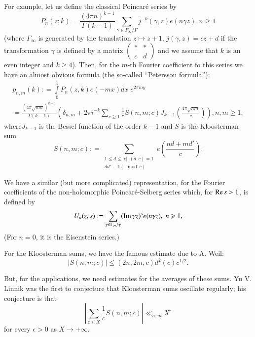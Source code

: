 For example, let us define the classical Poincar\'e series by 
\begin{equation}
P_n (z;k) = \frac{(4\pi n)^{k-1}}{\Gamma (k-1)} \sum\limits_{\gamma \in \Gamma_\infty / \Gamma} j^{-k} (\gamma, z) e (n\gamma z), n \geqslant 1 \label{art7-eq1.5}
\end{equation}
(where $\Gamma_\infty$ is generated by the translation $z \mapsto z + 1$, $j(\gamma, z) = cz + d$ if the transformation $\gamma$ is defined by a matrix $\left(\begin{smallmatrix}
\ast & \ast\\
c & d
\end{smallmatrix} \right)$ and we assume that $k$ is an even integer and $k \geqslant 4$). Then, for the $m$-th Fourier coefficient fo this series we have an almost obvious formula (the so-called ``Petersson formula''):
\begin{align}
p_{n,m} (k) : = \int\limits^1_0 P_n (z,k) e (-mx) dx \; e^{2\pi my}\label{art7-eq1.6}\\
 = \frac{(4\pi \sqrt{nm})^{k-1}}{\Gamma (k-1)} (\delta_{n,m} + 2 \pi i^{-k} \sum\limits_{c \geqslant 1} \frac{1}{c} S (n, m; c) J_{k-1} \left( \frac{4\pi \sqrt{nm}}{c}\right)), n, m \geqslant 1,
\end{align}
where\pageoriginale $J_{k-1}$ is the Bessel function of the order $k-1$ and $S$ is the Kloosterman sum
\begin{equation}
S(n, m;c): =  \sum\limits_{\substack{1\leqslant d \leqslant |c|, (d,c) =1\\ dd' \equiv 1 (\mod c)}} e \left(\frac{nd+md'}{c} \right).
\label{art7-eq1.7}
\end{equation}

We have a similar (but more complicated) representation, for the Fourier coefficients of the non-holomorphic Poincar\'e-Selberg series which, for $\operatorname{Re} s>1$, is defined by 
\begin{equation}
U_n(z,s) : = \sum\limits_{\gamma \in \Gamma_\infty / \gamma} (\operatorname{Im} \gamma z)^s e (n \gamma z), \; n \geqslant 1, \label{art7-eq1.8}
\end{equation}
(For $n=0$, it is the Eisenstein series.)

For the Kloosterman sums, we have the famous estimate due to A. Weil:
\begin{equation}
|S(n, m; c)| \leqslant (2n, 2m, c) d^2 (c) c^{1/2}. \label{art7-eq1.9}
\end{equation}

But, for the applications, we need estimates for the averages of these sums. Yu V. Linnik was the first to conjecture that Kloosterman sums oscillate regularly; his conjecture is that
\begin{equation}
\left|\sum\limits_{c \leqslant X} \frac{1}{c} S (n, m; c) \right| \ll_{n,m} X^\epsilon \label{art7-eq1.10}
\end{equation}
for every $\epsilon > 0$ as $X  \to + \infty$.

